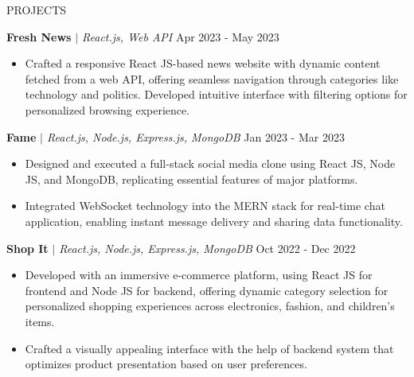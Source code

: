 \documentclass{resume} %
\begin{document}
\begin{rSection}{\large P\small ROJECTS} 
\vspace{-1.25em}
\item \textbf{Fresh News} {\textit{$|$ React.js, Web API} \hfill Apr 2023 - May 2023}
\begin{itemize}
    \itemsep -1pt {} 
     \item Crafted a responsive React JS-based news website with dynamic content fetched from a web API, offering seamless navigation through categories like technology and politics. Developed intuitive interface with filtering options for personalized browsing experience.
 \end{itemize}

\item \textbf{Fame} {\textit{$|$ React.js, Node.js, Express.js, MongoDB} \hfill Jan 2023 - Mar 2023} 
\begin{itemize}
    \itemsep -2pt {} 
     \item Designed and executed a full-stack social media clone using React JS, Node JS, and MongoDB, replicating essential features of major platforms.
     \item Integrated WebSocket technology into the MERN stack for real-time chat application, enabling instant message delivery and sharing data functionality.
 \end{itemize}
 
\item \textbf{Shop It} {\textit{$|$ React.js, Node.js, Express.js, MongoDB} \hfill Oct 2022 - Dec 2022} 
\begin{itemize}
    \itemsep -2pt {} 
     \item Developed with an immersive e-commerce platform, using React JS for frontend and Node JS for backend, offering dynamic category selection for personalized shopping experiences across electronics, fashion, and children's items.
     \item Crafted a visually appealing interface with the help of backend system that optimizes product presentation based on user preferences.
 \end{itemize}
\end{rSection} 
\end{document}
